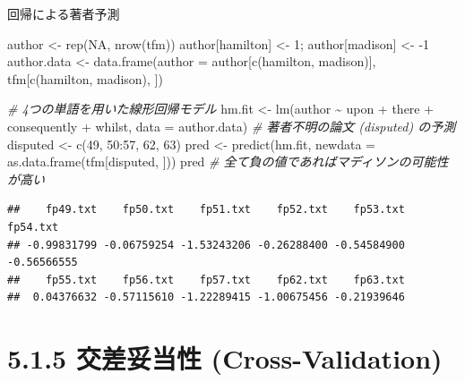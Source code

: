 \documentclass[
  ignorenonframetext,
]{beamer}
\newenvironment{Shaded}{\begin{snugshade}}{\end{snugshade}}
\newcommand{\AttributeTok}[1]{\textcolor[rgb]{0.77,0.63,0.00}{#1}}
\newcommand{\CommentTok}[1]{\textcolor[rgb]{0.56,0.35,0.01}{\textit{#1}}}
\newcommand{\ConstantTok}[1]{\textcolor[rgb]{0.00,0.00,0.00}{#1}}
\newcommand{\DecValTok}[1]{\textcolor[rgb]{0.00,0.00,0.81}{#1}}
\newcommand{\FunctionTok}[1]{\textcolor[rgb]{0.00,0.00,0.00}{#1}}
\newcommand{\NormalTok}[1]{#1}
\newcommand{\OtherTok}[1]{\textcolor[rgb]{0.56,0.35,0.01}{#1}}
\newcommand{\SpecialCharTok}[1]{\textcolor[rgb]{0.00,0.00,0.00}{#1}}
\begin{document}
\begin{frame}[fragile]{回帰による著者予測}
\protect\hypertarget{ux56deux5e30ux306bux3088ux308bux8457ux8005ux4e88ux6e2c}{}
\scriptsize

\begin{Shaded}
\begin{Highlighting}[]
\NormalTok{author }\OtherTok{\textless{}{-}} \FunctionTok{rep}\NormalTok{(}\ConstantTok{NA}\NormalTok{, }\FunctionTok{nrow}\NormalTok{(tfm))}
\NormalTok{author[hamilton] }\OtherTok{\textless{}{-}} \DecValTok{1}\NormalTok{; author[madison] }\OtherTok{\textless{}{-}} \SpecialCharTok{{-}}\DecValTok{1}
\NormalTok{author.data }\OtherTok{\textless{}{-}} \FunctionTok{data.frame}\NormalTok{(}\AttributeTok{author =}\NormalTok{ author[}\FunctionTok{c}\NormalTok{(hamilton, madison)], }
\NormalTok{                          tfm[}\FunctionTok{c}\NormalTok{(hamilton, madison), ])}

\CommentTok{\# 4つの単語を用いた線形回帰モデル}
\NormalTok{hm.fit }\OtherTok{\textless{}{-}} \FunctionTok{lm}\NormalTok{(author }\SpecialCharTok{\textasciitilde{}}\NormalTok{ upon }\SpecialCharTok{+}\NormalTok{ there }\SpecialCharTok{+}\NormalTok{ consequently }\SpecialCharTok{+}\NormalTok{ whilst, }
             \AttributeTok{data =}\NormalTok{ author.data)}
\CommentTok{\# 著者不明の論文 (disputed) の予測}
\NormalTok{disputed }\OtherTok{\textless{}{-}} \FunctionTok{c}\NormalTok{(}\DecValTok{49}\NormalTok{, }\DecValTok{50}\SpecialCharTok{:}\DecValTok{57}\NormalTok{, }\DecValTok{62}\NormalTok{, }\DecValTok{63}\NormalTok{)}
\NormalTok{pred }\OtherTok{\textless{}{-}} \FunctionTok{predict}\NormalTok{(hm.fit, }\AttributeTok{newdata =} \FunctionTok{as.data.frame}\NormalTok{(tfm[disputed, ]))}
\NormalTok{pred }\CommentTok{\# 全て負の値であればマディソンの可能性が高い}
\end{Highlighting}
\end{Shaded}

\begin{verbatim}
##    fp49.txt    fp50.txt    fp51.txt    fp52.txt    fp53.txt    fp54.txt 
## -0.99831799 -0.06759254 -1.53243206 -0.26288400 -0.54584900 -0.56566555 
##    fp55.txt    fp56.txt    fp57.txt    fp62.txt    fp63.txt 
##  0.04376632 -0.57115610 -1.22289415 -1.00675456 -0.21939646
\end{verbatim}

\normalsize
\end{frame}

\hypertarget{ux4ea4ux5deeux59a5ux5f53ux6027-cross-validation}{%
\section{5.1.5 交差妥当性
(Cross-Validation)}\label{ux4ea4ux5deeux59a5ux5f53ux6027-cross-validation}}
\end{document}
